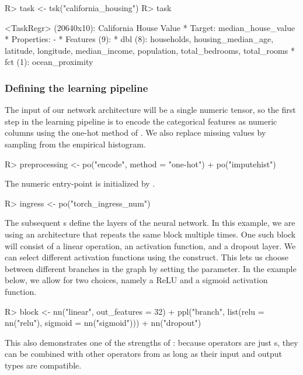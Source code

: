 \documentclass[article]{jss}
\theoremstyle{definition}
\begin{document}
\begin{CodeInput}
R> task <- tsk("california_housing")
R> task
\end{CodeInput}
\begin{CodeOutput}
<TaskRegr> (20640x10): California House Value
 * Target: median_house_value
 * Properties: -
 * Features (9):
   * dbl (8): households, housing_median_age, latitude, longitude,
   median_income, population, total_bedrooms, total_rooms
   * fct (1): ocean_proximity
\end{CodeOutput}

\subsubsection{Defining the learning pipeline}
The input of our network architecture will be a single numeric tensor, so the first step in the learning pipeline is to encode the categorical features as numeric columns using the one-hot method of .
We also replace missing values by sampling from the empirical histogram.

\begin{CodeInput}
R> preprocessing <- po("encode", method = "one-hot") %
+    po("imputehist")
\end{CodeInput}

The numeric entry-point is initialized by .

\begin{CodeInput}
R> ingress <- po("torch_ingress_num")
\end{CodeInput}

The subsequent s define the layers of the neural network.
In this example, we are using an architecture that repeats the same block multiple times.
One such block will consist of a linear operation, an activation function, and a dropout layer.
We can select different activation functions using the  construct.
This lets us choose between different branches in the graph by setting the  parameter.
In the example below, we allow for two choices, namely a ReLU and a sigmoid activation function.

\begin{CodeInput}
R> block <- nn("linear", out_features = 32) %
+    ppl("branch", list(relu = nn("relu"), sigmoid = nn("sigmoid"))) %
+    nn("dropout")
\end{CodeInput}

This also demonstrates one of the strengths of : because  operators are just s, they can be combined with other operators from  as long as their input and output types are compatible.
\end{document}
